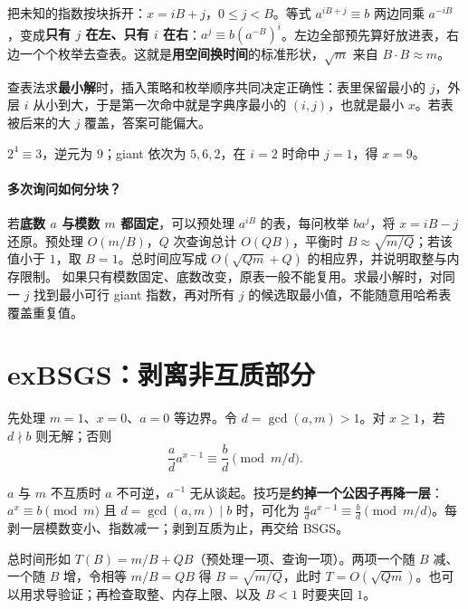 \begin{tip}
把未知的指数按块拆开：$x=iB+j$，$0\le j<B$。等式 $a^{iB+j}\equiv b$ 两边同乘 $a^{-iB}$，变成\textbf{只有 $j$ 在左、只有 $i$ 在右}：$a^j\equiv b(a^{-B})^i$。左边全部预先算好放进表，右边一个个枚举去查表。这就是\textbf{用空间换时间}的标准形状，$\sqrt m$ 来自 $B\cdot B\approx m$。
\end{tip}

\begin{tip}
查表法求\textbf{最小解}时，插入策略和枚举顺序共同决定正确性：表里保留最小的 $j$，外层 $i$ 从小到大，于是第一次命中就是字典序最小的 $(i,j)$，也就是最小 $x$。若表被后来的大 $j$ 覆盖，答案可能偏大。
\end{tip}

$2^4\equiv3$，逆元为 $9$；giant 依次为 $5,6,2$，在 $i=2$ 时命中 $j=1$，得 $x=9$。

\paragraph{多次询问如何分块？}
若\textbf{底数 $a$ 与模数 $m$ 都固定}，可以预处理 $a^{iB}$ 的表，每问枚举 $ba^j$，将 $x=iB-j$ 还原。预处理 $O(m/B)$，$Q$ 次查询总计 $O(QB)$，平衡时 $B\approx\sqrt{m/Q}$；若该值小于 $1$，取 $B=1$。总时间应写成 $O(\sqrt{Qm}+Q)$ 的相应界，并说明取整与内存限制。
如果只有模数固定、底数改变，原表一般不能复用。求最小解时，对同一 $j$ 找到最小可行 giant 指数，再对所有 $j$ 的候选取最小值，不能随意用哈希表覆盖重复值。


\section{exBSGS：剥离非互质部分}
先处理 $m=1$、$x=0$、$a=0$ 等边界。令 $d=\gcd(a,m)>1$。对 $x\ge1$，若 $d\nmid b$ 则无解；否则
\[
 \frac ad a^{x-1}\equiv\frac bd\pmod{m/d}.
\]

\begin{tip}
$a$ 与 $m$ 不互质时 $a$ 不可逆，$a^{-1}$ 无从谈起。技巧是\textbf{约掉一个公因子再降一层}：$a^x\equiv b\pmod m$ 且 $d=\gcd(a,m)\mid b$ 时，可化为 $\frac ad a^{x-1}\equiv\frac b d\pmod{m/d}$。每剥一层模数变小、指数减一；剥到互质为止，再交给 BSGS。
\end{tip}

\begin{tip}
总时间形如 $T(B)=m/B+QB$（预处理一项、查询一项）。两项一个随 $B$ 减、一个随 $B$ 增，令相等 $m/B=QB$ 得 $B=\sqrt{m/Q}$，此时 $T=O(\sqrt{Qm})$。也可以用求导验证；再检查取整、内存上限、以及 $B<1$ 时要夹回 $1$。
\end{tip}


